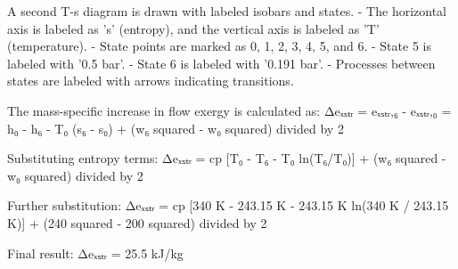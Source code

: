 A second T-s diagram is drawn with labeled isobars and states.  
- The horizontal axis is labeled as 's' (entropy), and the vertical axis is labeled as 'T' (temperature).  
- State points are marked as 0, 1, 2, 3, 4, 5, and 6.  
- State 5 is labeled with '0.5 bar'.  
- State 6 is labeled with '0.191 bar'.  
- Processes between states are labeled with arrows indicating transitions.

The mass-specific increase in flow exergy is calculated as:  
Δeₓₛₜᵣ = eₓₛₜᵣ,₆ - eₓₛₜᵣ,₀ = h₀ - h₆ - T₀ (s₆ - s₀) + (w₆ squared - w₀ squared) divided by 2  

Substituting entropy terms:  
Δeₓₛₜᵣ = cp [T₀ - T₆ - T₀ ln(T₆/T₀)] + (w₆ squared - w₀ squared) divided by 2  

Further substitution:  
Δeₓₛₜᵣ = cp [340 K - 243.15 K - 243.15 K ln(340 K / 243.15 K)] + (240 squared - 200 squared) divided by 2  

Final result:  
Δeₓₛₜᵣ = 25.5 kJ/kg